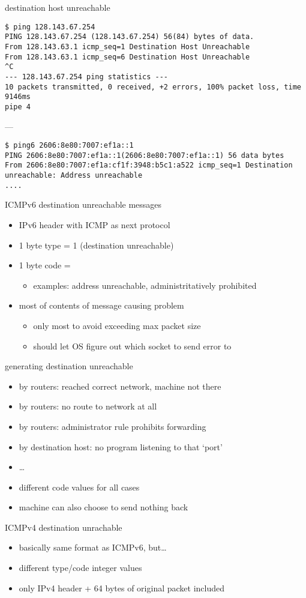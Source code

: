 \begin{frame}[fragile]{destination host unreachable}
\begin{Verbatim}[fontsize=\small]
$ ping 128.143.67.254
PING 128.143.67.254 (128.143.67.254) 56(84) bytes of data.
From 128.143.63.1 icmp_seq=1 Destination Host Unreachable
From 128.143.63.1 icmp_seq=6 Destination Host Unreachable
^C
--- 128.143.67.254 ping statistics ---
10 packets transmitted, 0 received, +2 errors, 100% packet loss, time 9146ms
pipe 4
\end{Verbatim}
---
\begin{Verbatim}
$ ping6 2606:8e80:7007:ef1a::1
PING 2606:8e80:7007:ef1a::1(2606:8e80:7007:ef1a::1) 56 data bytes
From 2606:8e80:7007:ef1a:cf1f:3948:b5c1:a522 icmp_seq=1 Destination unreachable: Address unreachable
....
\end{Verbatim}
\end{frame}

\begin{frame}{ICMPv6 destination unreachable messages}
\begin{itemize}
\item IPv6 header with ICMP as next protocol
\item 1 byte type = 1 (destination unreachable)
\item 1 byte code =
    \begin{itemize}
    \item examples: address unreachable, administritatively prohibited
    \end{itemize}
\item most of contents of message causing problem
    \begin{itemize}
    \item only most to avoid exceeding max packet size
    \item should let OS figure out which socket to send error to
    \end{itemize}
\end{itemize}
\end{frame}

\begin{frame}{generating destination unreachable}
    \begin{itemize}
    \item by routers: reached correct network, machine not there
    \item by routers: no route to network at all
    \item by routers: administrator rule prohibits forwarding
    \item by destination host: no program listening to that `port'
    \item \ldots
    \vspace{.5cm}
    \item different code values for all cases
    \item machine can also choose to send nothing back
    \end{itemize}
\end{frame}

\begin{frame}{ICMPv4 destination unrachable}
\begin{itemize}
\item basically same format as ICMPv6, but\ldots
\item different type/code integer values
\item only IPv4 header + 64 bytes of original packet included
\end{itemize}
\end{frame}
